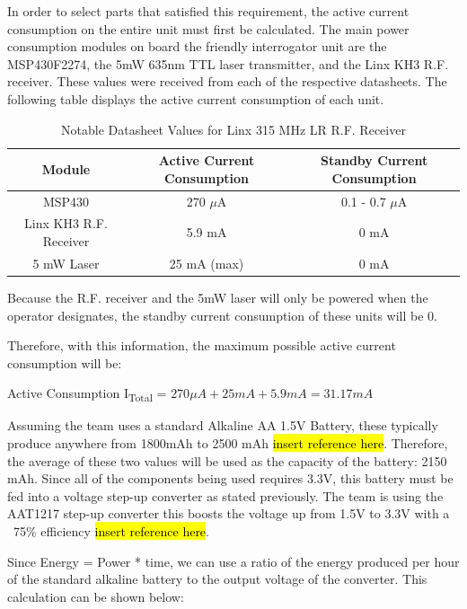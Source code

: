 \documentclass[letterpaper,10pt]{article}
\begin{document}
\begin{spacing}{1.15}
In order to select parts that satisfied this requirement, the active current consumption on the entire unit must first be calculated. The main power consumption modules on board the friendly interrogator unit are the MSP430F2274, the 5mW 635nm TTL laser transmitter, and the Linx KH3 R.F. receiver. These values were received from each of the respective datasheets. The following table displays the active current consumption of each unit. 


\begin{table}[htbp]
	\centering
	\begin{tabular}{c|c|c}	%
		\toprule	%
		Module & Active Current Consumption & Standby Current Consumption\\
		\midrule
		MSP430 & 270 $\mu$A & 0.1 - 0.7 $\mu$A\\ 
		Linx KH3 R.F. Receiver & 5.9 mA & 0 mA\\
		5 mW Laser & 25 mA (max) & 0 mA \\
	\bottomrule	%
	\end{tabular}%
	\caption{Notable Datasheet Values for Linx 315 MHz LR R.F. Receiver}
	\label{tab:table2}	%
\end{table}%

Because the R.F. receiver and the 5mW laser will only be powered when the operator designates, the standby current consumption of these units will be 0.

Therefore, with this information, the maximum possible active current consumption will be:
\begin{center}{Active Consumption I\textsubscript{Total} = $270 \mu A + 25 mA + 5.9 mA = 31.17 mA $}\end{center}

Assuming the team uses a standard Alkaline AA 1.5V Battery, these typically produce anywhere from 1800mAh to 2500 mAh \hl{insert reference here}. Therefore, the average of these two values will be used as the capacity of the battery: 2150 mAh. Since all of the components being used requires 3.3V, this battery must be fed into a voltage step-up converter as stated previously. The team is using the AAT1217 step-up converter this boosts the voltage up from 1.5V to 3.3V with a ~75\% efficiency \hl{insert reference here}.

Since Energy = Power * time, we can use a ratio of the energy produced per hour of the standard alkaline battery to the output voltage of the converter. This calculation can be shown below:




\end{spacing}
\end{document}
